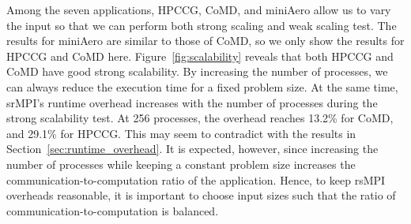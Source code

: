 Among the seven applications, HPCCG, CoMD, and miniAero allow us to vary the input so that we can perform both strong scaling and weak scaling test. The results for miniAero are similar to those of CoMD, so we only show the results for HPCCG and CoMD here. Figure~\ref{fig:scalability} reveals that both HPCCG and CoMD have good strong scalability. By increasing the number of processes, we can always reduce the execution time for a fixed problem size. At the same time, srMPI's runtime overhead increases with the number of processes during the strong scalability test. At 256 processes, the overhead reaches 13.2\% for CoMD, and 29.1\% for HPCCG. This may seem to contradict with the results in Section~\ref{sec:runtime_overhead}. It is expected, however, since increasing the number of processes while keeping a constant problem size increases the communication-to-computation ratio of the application. Hence, to keep rsMPI overheads reasonable, it is important to choose input sizes such that the ratio of communication-to-computation is balanced. 


